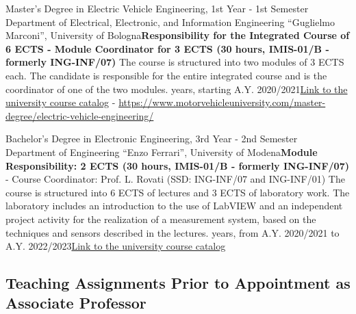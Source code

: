 {
{Master's Degree in Electric Vehicle Engineering, 1st Year - 1st Semester}
{\newline  Department of Electrical, Electronic, and Information Engineering ``Guglielmo Marconi'', University of Bologna}{\newline \textbf{Responsibility for the Integrated Course of 6 ECTS - Module Coordinator for 3 ECTS (30 hours, IMIS-01/B - formerly ING-INF/07)}\newline
    The course is structured into two modules of 3 ECTS each. The candidate is responsible for the entire integrated course and is the coordinator of one of the two modules. years, starting A.Y. 2020/2021}{\href{https://www.unibo.it/en/study/course-units-transferable-skills-moocs/course-unit-catalogue?codiceMateria=93730&annoAccademico=2024&codiceCorso=5699&single=True&search=True}{Link to the university course catalog} - \href{https://www.motorvehicleuniversity.com/master-degree/electric-vehicle-engineering/}{https://www.motorvehicleuniversity.com/master-degree/electric-vehicle-engineering/}}


{Bachelor's Degree in Electronic Engineering, 3rd Year - 2nd Semester}
{\newline  Department of Engineering “Enzo Ferrari'', University of Modena}{\newline \textbf{Module Responsibility: 2 ECTS (30 hours, IMIS-01/B - formerly ING-INF/07)} - Course Coordinator: Prof. L. Rovati (SSD: ING-INF/07 and ING-INF/01)\newline
    The course is structured into 6 ECTS of lectures and 3 ECTS of laboratory work. The laboratory includes an introduction to the use of LabVIEW and an independent project activity for the realization of a measurement system, based on the techniques and sensors described in the lectures. years, from A.Y. 2020/2021 to A.Y. 2022/2023}{\href{https://unimore.coursecatalogue.cineca.it/insegnamenti/2022/24151/2016/10000/10359?coorte=2020&schemaid=19254}{Link to the university course catalog}}

\subsection{Teaching Assignments Prior to Appointment as Associate Professor}

}

